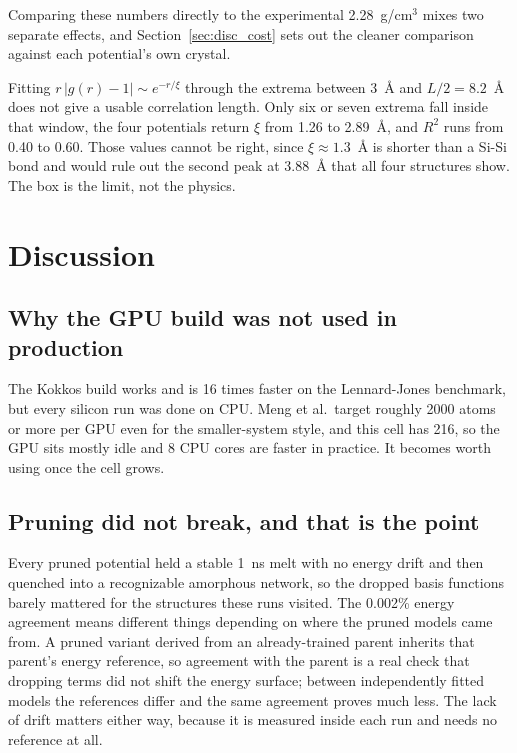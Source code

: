 \documentclass[11pt]{article}
\begin{document}
Comparing these numbers directly to the experimental 2.28~g/cm$^3$ mixes two separate effects, and Section~\ref{sec:disc_cost} sets out the cleaner comparison against each potential's own crystal.

Fitting $r\,|g(r)-1| \sim e^{-r/\xi}$ through the extrema between 3~\AA{} and $L/2=8.2$~\AA{} does not give a usable correlation length. Only six or seven extrema fall inside that window, the four potentials return $\xi$ from 1.26 to 2.89~\AA, and $R^2$ runs from 0.40 to 0.60. Those values cannot be right, since $\xi\approx1.3$~\AA{} is shorter than a Si-Si bond and would rule out the second peak at 3.88~\AA{} that all four structures show. The box is the limit, not the physics.

\section{Discussion}

\subsection{Why the GPU build was not used in production}
\label{sec:disc_gpu}
The Kokkos build works and is 16 times faster on the Lennard-Jones benchmark, but every silicon run was done on CPU. Meng et al.\ target roughly 2000 atoms or more per GPU even for the smaller-system style, and this cell has 216, so the GPU sits mostly idle and 8 CPU cores are faster in practice. It becomes worth using once the cell grows.

\subsection{Pruning did not break, and that is the point}
Every pruned potential held a stable 1~ns melt with no energy drift and then quenched into a recognizable amorphous network, so the dropped basis functions barely mattered for the structures these runs visited. The 0.002\% energy agreement means different things depending on where the pruned models came from. A pruned variant derived from an already-trained parent inherits that parent's energy reference, so agreement with the parent is a real check that dropping terms did not shift the energy surface; between independently fitted models the references differ and the same agreement proves much less. The lack of drift matters either way, because it is measured inside each run and needs no reference at all.
\end{document}
